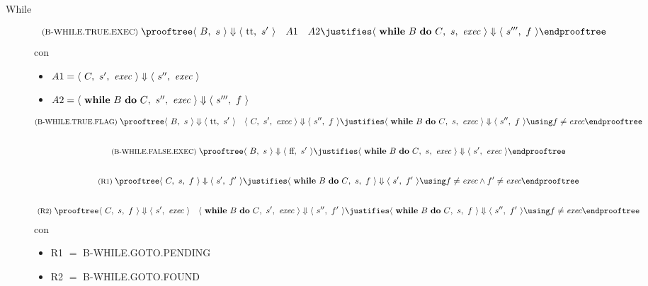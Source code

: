 \begin{description}
\item[While]
\begin{gather*}
  \rulename{B-WHILE.TRUE.EXEC}
  \prooftree
    \config{B}{s} \Downarrow \config{\textrm{tt}}{s'}
      \quad A1
      \quad A2
    \justifies
        \configG{\textrm{$\kw{while}$ $B$ $\kw{do}$ $C$}}{s}{\fexec} \Downarrow \config{s'''}{f}
  \endprooftree
\end{gather*}
con 
\begin{itemize}
\item $A1 = \langle\ C,\ s',\ \textit{exec}\ \rangle \Downarrow \langle\ s'',\ \textit{exec}\ \rangle$
\item $A2 = \langle\ \textrm{$\mathop{\textup{\textbf{while}}}$ $B$ $\mathop{\textup{\textbf{do}}}$ $C$},\ s'',\ \textit{exec}\ \rangle \Downarrow \langle\ s''',\ f\ \rangle$ 
\end{itemize}
\begin{gather*}
  \rulename{B-WHILE.TRUE.FLAG}
  \prooftree
    \config{B}{s} \Downarrow \config{\textrm{tt}}{s'}
      \quad \configG{C}{s'}{\fexec} \Downarrow \config{s''}{f}
    \justifies
      \configG{\textrm{$\kw{while}$ $B$ $\kw{do}$ $C$}}{s}{\fexec} \Downarrow \config{s''}{f}
    \using f \neq \fexec
  \endprooftree
  \\[2em]
  \rulename{B-WHILE.FALSE.EXEC}
  \prooftree
    \config{B}{s} \Downarrow \config{\textrm{ff}}{s'}
    \justifies
      \configG{\textrm{$\kw{while}$ $B$ $\kw{do}$ $C$}}{s}{\fexec} \Downarrow \config{s'}{\fexec}
  \endprooftree
  \\[2em]
  \rulename{R1}
  \prooftree
    \configG{C}{s}{f} \Downarrow \config{s'}{f'}
    \justifies
    \configG{\textrm{$\kw{while}$ $B$ $\kw{do}$ $C$}}{s}{f} \Downarrow \config{s'}{f'}
    \using f \neq \fexec \land f' \neq \fexec
  \endprooftree
  \\[2em]
  \rulename{R2}
  \prooftree
    \configG{C}{s}{f} \Downarrow \config{s'}{\fexec}
      \quad \configG{\textrm{$\kw{while}$ $B$ $\kw{do}$ $C$}}{s'}{\fexec} \Downarrow \config{s''}{f'}
    \justifies
      \configG{\textrm{$\kw{while}$ $B$ $\kw{do}$ $C$}}{s}{f} \Downarrow \config{s''}{f'}
    \using f \neq \fexec
  \endprooftree
\end{gather*}
con
\begin{itemize}
  \item R1 $=$ B-WHILE.GOTO.PENDING
  \item R2 $=$ B-WHILE.GOTO.FOUND
\end{itemize}

\end{description}

